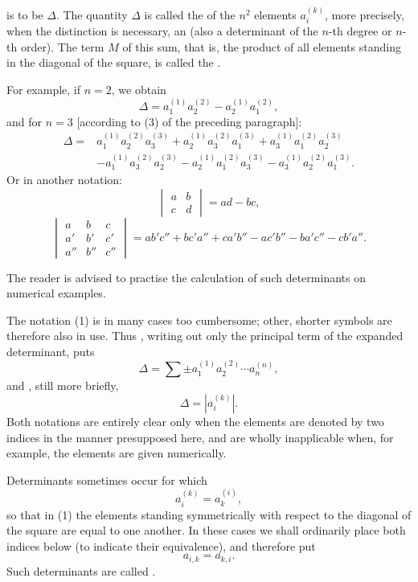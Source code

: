
is to be \(\Delta\). The quantity \(\Delta\) is called the  of the \(n^2\) elements \(a_i^{(k)}\), more precisely, when the distinction is necessary, an  (also a determinant of the \(n\)-th degree or \(n\)-th order). The term \(M\) of this sum, that is, the product of all elements standing in the diagonal of the square, is called the .

For example, if \(n=2\), we obtain
\begin{equation}
\Delta=a_1^{(1)}a_2^{(2)}-a_2^{(1)}a_1^{(2)},
\tag{4}
\end{equation}
and for \(n=3\) [according to (3) of the preceding paragraph]:
\begin{equation}
\begin{aligned}
\Delta={}&a_1^{(1)}a_2^{(2)}a_3^{(3)}
+a_2^{(1)}a_3^{(2)}a_1^{(3)}
+a_3^{(1)}a_1^{(2)}a_2^{(3)}\\
&-a_1^{(1)}a_3^{(2)}a_2^{(3)}
-a_2^{(1)}a_1^{(2)}a_3^{(3)}
-a_3^{(1)}a_2^{(2)}a_1^{(3)}.
\end{aligned}
\tag{5}
\end{equation}
Or in another notation:
\begin{equation}
\begin{vmatrix}
a&b\\
c&d
\end{vmatrix}
=ad-bc,
\tag{6}
\end{equation}
\begin{equation}
\begin{vmatrix}
a&b&c\\
a'&b'&c'\\
a''&b''&c''
\end{vmatrix}
=ab'c''+bc'a''+ca'b''-ac'b''-ba'c''-cb'a''.
\tag{7}
\end{equation}

The reader is advised to practise the calculation of such determinants on numerical examples.

The notation (1) is in many cases too cumbersome; other, shorter symbols are therefore also in use. Thus , writing out only the principal term of the expanded determinant, puts
\begin{equation}
\Delta=\sum \pm a_1^{(1)}a_2^{(2)}\cdots a_n^{(n)},
\tag{8}
\end{equation}
and , still more briefly,
\begin{equation}
\Delta=\left|a_i^{(k)}\right|.
\tag{9}
\end{equation}
Both notations are entirely clear only when the elements are denoted by two indices in the manner presupposed here, and are wholly inapplicable when, for example, the elements are given numerically.

Determinants sometimes occur for which
\[
a_i^{(k)}=a_k^{(i)},
\]
so that in (1) the elements standing symmetrically with respect to the diagonal of the square are equal to one another. In these cases we shall ordinarily place both indices below (to indicate their equivalence), and therefore put
\[
a_{i,k}=a_{k,i}.
\]
Such determinants are called .

